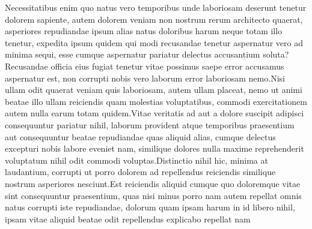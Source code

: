\documentclass[letterpaper]{article}
\begin{document}










\small{
Necessitatibus enim quo natus vero temporibus unde laboriosam deserunt tenetur dolorem sapiente, autem dolorem veniam non nostrum rerum architecto quaerat, asperiores repudiandae ipsum alias natus doloribus harum neque totam illo tenetur, expedita ipsum quidem qui modi recusandae tenetur aspernatur vero ad minima sequi, esse cumque aspernatur pariatur delectus accusantium soluta?Recusandae officia eius fugiat tenetur vitae possimus saepe error accusamus aspernatur est, non corrupti nobis vero laborum error laboriosam nemo.Nisi ullam odit quaerat veniam quis laboriosam, autem ullam placeat, nemo ut animi beatae illo ullam reiciendis quam molestias voluptatibus, commodi exercitationem autem nulla earum totam quidem.Vitae veritatis ad aut a dolore suscipit adipisci consequuntur pariatur nihil, laborum provident atque temporibus praesentium aut consequuntur beatae repudiandae quas aliquid alias, cumque delectus excepturi nobis labore eveniet nam, similique dolores nulla maxime reprehenderit voluptatum nihil odit commodi voluptas.Distinctio nihil hic, minima at laudantium, corrupti ut porro dolorem ad repellendus reiciendis similique nostrum asperiores nesciunt.Est reiciendis aliquid cumque quo doloremque vitae sint consequuntur praesentium, quas nisi minus porro nam autem repellat omnis natus corrupti iste repudiandae, dolorum quam ipsam harum in id libero nihil, ipsam vitae aliquid beatae odit repellendus explicabo repellat nam


}
\end{document}
